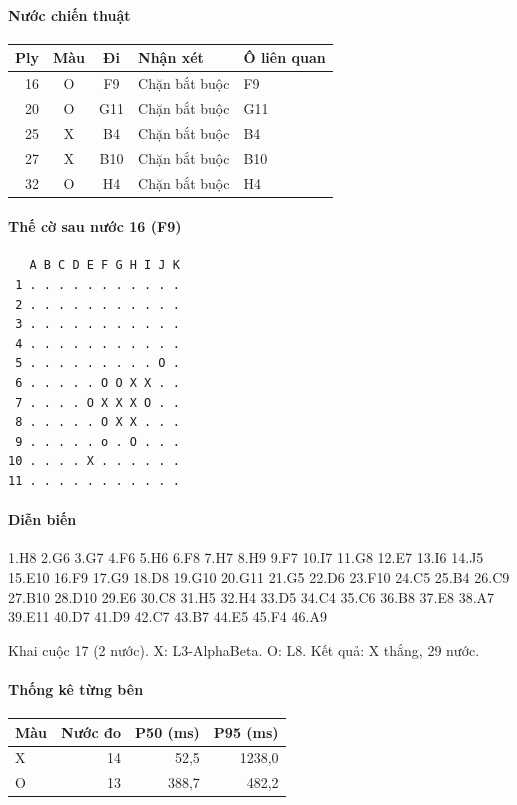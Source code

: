 \paragraph{Nước chiến thuật}
\begin{center}\small
\begin{tabular}{@{}rccll@{}}
\toprule
Ply & Màu & Đi & Nhận xét & Ô liên quan \\
\midrule
16 & O & F9 & Chặn bắt buộc & F9 \\
20 & O & G11 & Chặn bắt buộc & G11 \\
25 & X & B4 & Chặn bắt buộc & B4 \\
27 & X & B10 & Chặn bắt buộc & B10 \\
32 & O & H4 & Chặn bắt buộc & H4 \\
\bottomrule
\end{tabular}
\end{center}
\paragraph{Thế cờ sau nước 16 (F9)}
\begin{verbatim}
   A B C D E F G H I J K
 1 . . . . . . . . . . .
 2 . . . . . . . . . . .
 3 . . . . . . . . . . .
 4 . . . . . . . . . . .
 5 . . . . . . . . . O .
 6 . . . . . O O X X . .
 7 . . . . O X X X O . .
 8 . . . . . O X X . . .
 9 . . . . . o . O . . .
10 . . . . X . . . . . .
11 . . . . . . . . . . .
\end{verbatim}
\paragraph{Diễn biến}
{\footnotesize 1.H8 2.G6 3.G7 4.F6 5.H6 6.F8 7.H7 8.H9 9.F7 10.I7 11.G8 12.E7 13.I6 14.J5 15.E10 16.F9 17.G9 18.D8 19.G10 20.G11 21.G5 22.D6 23.F10 24.C5 25.B4 26.C9 27.B10 28.D10 29.E6 30.C8 31.H5 32.H4 33.D5 34.C4 35.C6 36.B8 37.E8 38.A7 39.E11 40.D7 41.D9 42.C7 43.B7 44.E5 45.F4 46.A9\par}
Khai cuộc 17 (2 nước). X: L3-AlphaBeta. O: L8. Kết quả: X thắng, 29 nước.
\paragraph{Thống kê từng bên}
\begin{center}\small
\begin{tabular}{@{}lrrr@{}}
\toprule
Màu & Nước đo & P50 (ms) & P95 (ms) \\
\midrule
X & 14 & 52,5 & 1238,0 \\
O & 13 & 388,7 & 482,2 \\
\bottomrule
\end{tabular}
\end{center}
